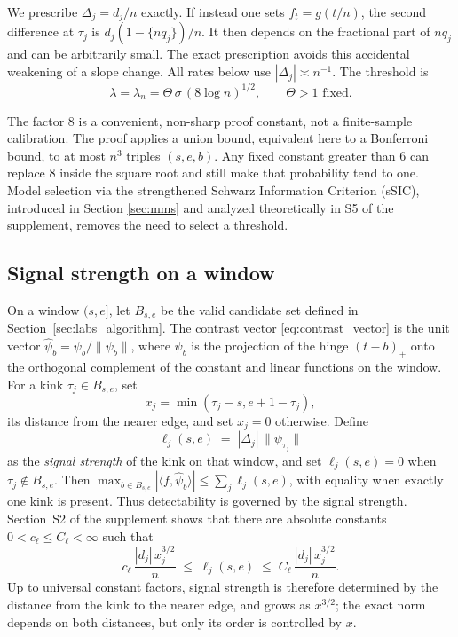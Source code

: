 \documentclass[12pt, a4paper]{article}
\begin{document}
We prescribe $\Delta_j=d_j/n$ exactly. If instead one sets $f_t=g(t/n)$, the second difference at $\tau_j$ is $d_j(1-\{nq_j\})/n$. It then depends on the fractional part of $nq_j$ and can be arbitrarily small. The exact prescription avoids this accidental weakening of a slope change. All rates below use $|\Delta_j|\asymp n^{-1}$. The threshold is
\begin{equation}
\label{eq:threshold}
\lambda = \lambda_n = \Theta \, \sigma \, (8 \log n)^{1/2}, \qquad \Theta > 1 \text{ fixed}.
\end{equation}

The factor 8 is a convenient, non-sharp proof constant, not a finite-sample calibration. The proof applies a union bound, equivalent here to a Bonferroni bound, to at most $n^3$ triples $(s,e,b)$. Any fixed constant greater than 6 can replace 8 inside the square root and still make that probability tend to one. Model selection via the strengthened Schwarz Information Criterion (sSIC), introduced in Section \ref{sec:mms} and analyzed theoretically in S5 of the supplement, removes the need to select a threshold.


\subsection{Signal strength on a window}

On a window $(s,e]$, let $B_{s,e}$ be the valid candidate set defined in Section~\ref{sec:labs_algorithm}. The contrast vector \eqref{eq:contrast_vector} is the unit vector $\hat\psi_b=\psi_b/\|\psi_b\|$, where $\psi_b$ is the projection of the hinge $(t-b)_+$ onto the orthogonal complement of the constant and linear functions on the window. For a kink $\tau_j\in B_{s,e}$, set
\[
x_j=\min(\tau_j-s,e+1-\tau_j),
\]
its distance from the nearer edge, and set $x_j=0$ otherwise. Define
\[
\ell_j(s,e) \; = \; |\Delta_j| \, \|\psi_{\tau_j}\|
\]
as the \emph{signal strength} of the kink on that window, and set $\ell_j(s,e)=0$ when $\tau_j\notin B_{s,e}$. Then
$\max_{b\in B_{s,e}}|\langle f,\hat\psi_b\rangle|\leq\sum_j\ell_j(s,e)$, with equality when exactly one kink is present. Thus detectability is governed by the signal strength. Section~S2 of the supplement shows that there are absolute constants $0<c_\ell\leq C_\ell<\infty$ such that
\begin{equation}
\label{eq:levlaw}
c_\ell \, \frac{|d_j| \, x_j^{3/2}}{n} \;\leq\; \ell_j(s,e) \;\leq\; C_\ell \, \frac{|d_j| \, x_j^{3/2}}{n} .
\end{equation}
Up to universal constant factors, signal strength is therefore determined by the distance from the kink to the nearer edge, and grows as $x^{3/2}$; the exact norm depends on both distances, but only its order is controlled by $x$.
\end{document}
